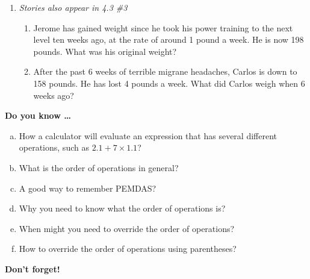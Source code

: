 \begin{enumerate}
\item \emph{Stories also appear in 4.3 \#3}
\begin{enumerate}
\item Jerome has gained weight since he took his power training to the next level ten weeks ago, at the rate of around 1 pound a week.  He is now 198 pounds.  What was his original weight? \vfill
\item After the past 6 weeks of terrible migrane headaches, Carlos is down to 158 pounds.  He has lost 4 pounds a week. What did Carlos weigh when 6 weeks ago? \vfill
\end{enumerate}

\end{enumerate} %

\newpage



\bigskip

\noindent \textbf{Do you know \ldots}

\begin{enumerate}[(a)]
\item How a calculator will evaluate an expression that has several different operations, such as $2.1 + 7 \times 1.1$? \vfill
\item What is the order of operations in general?  \vfill
\item A good way to remember PEMDAS? \vfill
\item Why you need to know what the order of operations is? \vfill
\item When might you need to override the order of operations? \vfill
\item How to override the order of operations using parentheses? \vfill
\end{enumerate}

\noindent \textbf{Don't forget!}
\vfill \vfill \vfill





